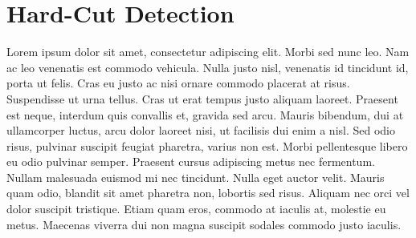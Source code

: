 \section{Hard-Cut Detection}
\label{sec:hard_cut}

Lorem ipsum dolor sit amet, consectetur adipiscing elit. Morbi sed nunc leo. Nam ac leo venenatis est commodo vehicula. Nulla justo nisl, venenatis id tincidunt id, porta ut felis. Cras eu justo ac nisi ornare commodo placerat at risus. Suspendisse ut urna tellus. Cras ut erat tempus justo aliquam laoreet. Praesent est neque, interdum quis convallis et, gravida sed arcu. Mauris bibendum, dui at ullamcorper luctus, arcu dolor laoreet nisi, ut facilisis dui enim a nisl. Sed odio risus, pulvinar suscipit feugiat pharetra, varius non est. Morbi pellentesque libero eu odio pulvinar semper. Praesent cursus adipiscing metus nec fermentum. Nullam malesuada euismod mi nec tincidunt. Nulla eget auctor velit. Mauris quam odio, blandit sit amet pharetra non, lobortis sed risus. Aliquam nec orci vel dolor suscipit tristique. Etiam quam eros, commodo at iaculis at, molestie eu metus. Maecenas viverra dui non magna suscipit sodales commodo justo iaculis.



